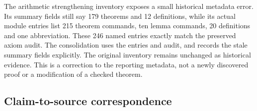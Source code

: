 The arithmetic strengthening inventory exposes a small historical metadata
error. Its summary fields still say 179 theorems and 12 definitions, while its
actual module entries list 215 theorem commands, ten lemma commands,
20 definitions and one abbreviation. These 246 named entries exactly match
the preserved axiom audit. The consolidation uses the entries and audit, and
records the stale summary fields explicitly. The original inventory remains
unchanged as historical evidence. This is a correction to the reporting
metadata, not a newly discovered proof or a modification of a checked theorem.

\subsection{Claim-to-source correspondence}


